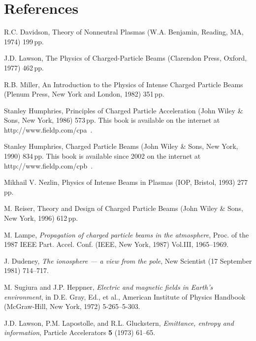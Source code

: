 \documentclass [12pt,a4paper,     ]{report} %
\begin{document}


\chapter{References}
\label{bibl:0}

\begin{enumerate}

 R.C. Davidson, Theory of Nonneutral Plasmas (W.A. Benjamin, Reading, MA, 1974) 199\,pp.

 J.D. Lawson, The Physics of Charged-Particle Beams (Clarendon Press, Oxford, 1977) 462\,pp.

 R.B. Miller, An Introduction to the Physics of Intense Charged Particle Beams (Plenum Press, New York and London, 1982) 351\,pp.

 Stanley Humphries, Principles of Charged Particle Acceleration (John Wiley \& Sons, New York, 1986) 573\,pp. This book is available on the internet at http://www.fieldp.com/cpa~.

 Stanley Humphries, Charged Particle Beams (John Wiley \& Sons, New York, 1990) 834\,pp. This book is available since 2002 on the internet at http://www.fieldp.com/cpb~.

 Mikhail V. Nezlin, Physics of Intense Beams in Plasmas (IOP, Bristol, 1993) 277\,pp. %

 M. Reiser, Theory and Design of Charged Particle Beams (John Wiley \& Sons, New York, 1996) 612\,pp.

 M. Lampe, \emph{Propagation of charged particle beams in the atmosphere}, Proc. of the 1987 IEEE Part. Accel. Conf. (IEEE, New York, 1987) Vol.III, 1965--1969.

 J. Dudeney, \emph{The ionosphere --- a view from the pole}, New Scientist (17 September 1981) 714--717.

 M. Sugiura and J.P. Heppner, \emph{Electric and magnetic fields in Earth's environment}, in D.E. Gray, Ed., et al., American Institute of Physics Handbook (McGraw-Hill, New York, 1972) 5-265--5-303.

 J.D. Lawson, P.M. Lapostolle, and R.L. Gluckstern, \emph{Emittance, entropy and information}, Particle Accelerators {\bf 5} (1973) 61--65.


\end{enumerate}
\end{document}
